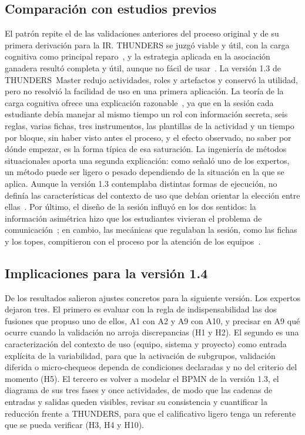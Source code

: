 \documentclass[12pt,letterpaper,oneside]{report}
\begin{document}
\subsection{Comparación con estudios previos}
El patrón repite el de las validaciones anteriores del proceso original y de su
primera derivación para la IR. THUNDERS se juzgó viable y útil, con la carga
cognitiva como principal reparo~\cite{agredo2022exploratory,agredo2023validating},
y la estrategia aplicada en la asociación ganadera resultó completa y útil, aunque no fácil de usar~\cite{agredo2023strategy}. La versión 1.3 de THUNDERS~Master redujo actividades,
roles y artefactos y conservó la utilidad, pero no resolvió la facilidad de uso
en una primera aplicación. La teoría de la carga cognitiva ofrece una
explicación razonable~\cite{sweller1988,dejong2010}, ya que en la sesión cada
estudiante debía manejar al mismo tiempo un rol con información secreta, seis
reglas, varias fichas, tres instrumentos, las plantillas de la actividad y un
tiempo por bloque, sin haber visto antes el proceso, y el efecto observado, no
saber por dónde empezar, es la forma típica de esa saturación. La ingeniería de 
métodos situacionales aporta una segunda explicación: como señaló uno de los expertos, 
un método puede ser ligero o pesado dependiendo de la situación en la que se aplica. 
Aunque la versión 1.3 contemplaba distintas formas de ejecución, no definía las 
características del contexto de uso que debían orientar la elección entre ellas~\cite{mirbel2006sme,kalus2013tailoring}. Por último, el diseño de la
sesión influyó en los dos sentidos: la información asimétrica hizo que los estudiantes vivieran el problema de
comunicación~\cite{zowghi2003teaching,svensson2017role}; en cambio, las
mecánicas que regulaban la sesión, como las fichas y los topes,
compitieron con el proceso por la atención de los
equipos~\cite{deterding2011gamification}.

\subsection{Implicaciones para la versión 1.4}
\label{sec:implicaciones_v14}
De los resultados salieron ajustes concretos para la siguiente versión. Los
expertos dejaron tres. El primero es evaluar con la regla de indispensabilidad
las dos fusiones que propuso uno de ellos, A1 con A2 y A9 con A10, y precisar en
A9 qué ocurre cuando la validación no arroja discrepancias (H1 y H2). El segundo
es una caracterización del contexto de uso (equipo, sistema y proyecto) como
entrada explícita de la variabilidad, para que la activación de subgrupos,
validación diferida o micro-chequeos dependa de condiciones declaradas y no del
criterio del momento (H5). El tercero es volver a modelar el BPMN de la versión
1.3, el diagrama de sus tres fases y once actividades, de modo que las cadenas
de entradas y salidas queden visibles, revisar su consistencia y cuantificar la
reducción frente a THUNDERS, para que el calificativo ligero tenga un referente
que se pueda verificar (H3, H4 y H10).
\end{document}
